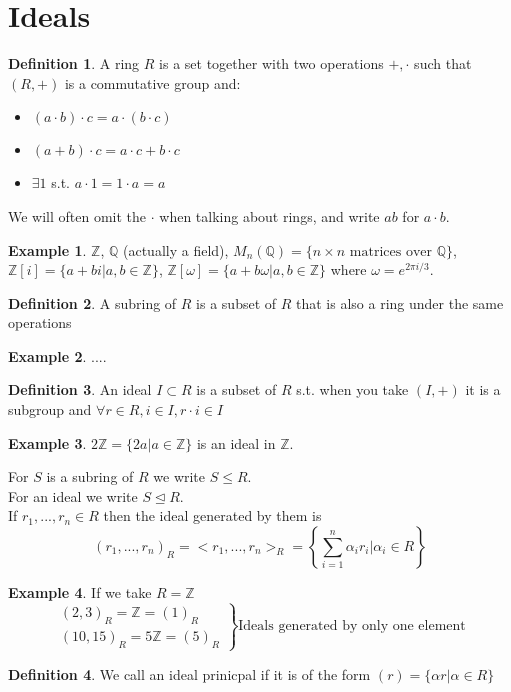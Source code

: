\documentclass{book}
\theoremstyle{definition}
\newtheorem*{defn}{Definition}
\newtheorem*{ex}{Example}
\newcommand{\ZZ}{\mathbb{Z}}
\newcommand{\QQ}{\mathbb{Q}}
\begin{document}
\section{Ideals}
\begin{defn}
A ring $R$ is a set together with two operations $+,\cdot$ such that $(R,+)$ is a commutative group and:
\begin{itemize}
\item $(a\cdot b)\cdot c = a\cdot (b\cdot c)$
\item $(a+b)\cdot c = a\cdot c+b\cdot c$
\item $\exists 1$ s.t. $a\cdot 1 = 1\cdot a = a$
\end{itemize}
\end{defn}
We will often omit the $\cdot$ when talking about rings, and write $ab$ for $a\cdot b$.
\begin{ex}
$\ZZ$, $\QQ$ (actually a field), $M_n(\QQ) = \{n\times n \text{ matrices over } \QQ\}$, $\ZZ[i] = \{a+bi|a,b \in\ZZ\}$, $\ZZ[\omega] = \{a+b\omega |a,b \in\ZZ\}$ where $\omega = e^{2\pi i /3}$.
\end{ex}
\begin{defn} A subring of $R$ is a subset of $R$ that is also a ring under the same operations\end{defn}
\begin{ex} .... \end{ex}
\begin{defn} An ideal $I \subset R$ is a subset of $R$ s.t. when you take $(I,+)$ it is a subgroup and $\forall r\in R, i\in I, r\cdot i \in I$
\end{defn}
\begin{ex}
$2\ZZ = \{2a|a\in\ZZ\}$ is an ideal in $\ZZ$.
\end{ex}
For $S$ is a subring of $R$ we write $S\leq R$. \\
For an ideal we write $S \trianglelefteq R$. \\
If $r_1,...,r_n \in R$ then the ideal generated by them is
$$(r_1,...,r_n)_R = <r_1,...,r_n>_R = \left\{ \sum_{i=1}^n \alpha_i r_i | \alpha_i \in R \right\}$$
\begin{ex}
If we take $R = \ZZ$
$$\left. \begin{matrix}
(2,3)_R = \ZZ = (1)_R \\
(10,15)_R = 5\ZZ = (5)_R
\end{matrix} \right\} \text{Ideals generated by only one element}$$
\end{ex}
\begin{defn}
We call an ideal prinicpal if it is of the form $(r) = \{\alpha r|\alpha\in R\}$
\end{defn}
\end{document}
